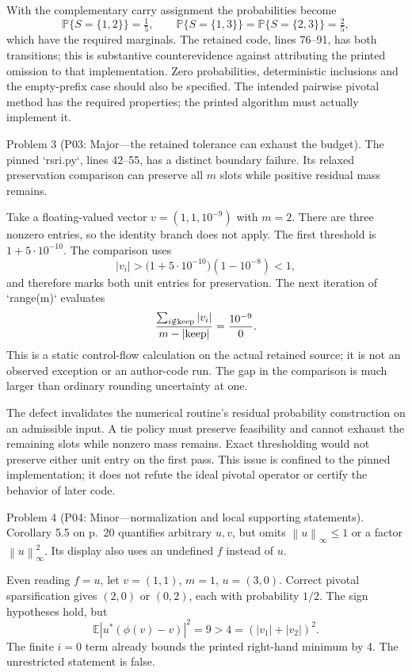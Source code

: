 \documentclass[10pt]{article}
\begin{document}
With the complementary carry assignment the probabilities become \[\mathbb P\{S=\{1,2\}\}=\tfrac15,\qquad
 \mathbb P\{S=\{1,3\}\}
 =\mathbb P\{S=\{2,3\}\}=\tfrac25,\] which have the required marginals. The retained code, lines 76–91, has both transitions; this is substantive counterevidence against attributing the printed omission to that implementation. Zero probabilities, deterministic inclusions and the empty-prefix case should also be specified. The intended pairwise pivotal method has the required properties; the printed algorithm must actually implement it.\par
Problem 3 (P03: Major—the retained tolerance can exhaust the budget).  The pinned `rsri.py`, lines 42–55, has a distinct boundary failure. Its relaxed preservation comparison can preserve all \(m\) slots while positive residual mass remains.\par
Take a floating-valued vector \(v=(1,1,10^{-9})\) with \(m=2\). There are three nonzero entries, so the identity branch does not apply. The first threshold is \(1+5\cdot10^{-10}\). The comparison uses \[|v_i|>\bigl(1+5\cdot10^{-10}\bigr)(1-10^{-8})<1,\] and therefore marks both unit entries for preservation. The next iteration of `range(m)` evaluates \[\frac{\sum_{i\notin{\rm keep}}|v_i|}
      {m-|{\rm keep}|}
 =\frac{10^{-9}}0.\] This is a static control-flow calculation on the actual retained source; it is not an observed exception or an author-code run. The gap in the comparison is much larger than ordinary rounding uncertainty at one.\par
The defect invalidates the numerical routine’s residual probability construction on an admissible input. A tie policy must preserve feasibility and cannot exhaust the remaining slots while nonzero mass remains. Exact thresholding would not preserve either unit entry on the first pass. This issue is confined to the pinned implementation; it does not refute the ideal pivotal operator or certify the behavior of later code.\par
Problem 4 (P04: Minor—normalization and local supporting statements).  Corollary 5.5 on p. 20 quantifies arbitrary \(u,v\), but omits \(\left\lVert u\right\rVert_\infty\le1\) or a factor \(\left\lVert u\right\rVert_\infty^2\). Its display also uses an undefined \(f\) instead of \(u\).\par
Even reading \(f=u\), let \(v=(1,1)\), \(m=1\), \(u=(3,0)\). Correct pivotal sparsification gives \((2,0)\) or \((0,2)\), each with probability \(1/2\). The sign hypotheses hold, but \[\mathbb E|u^*(\phi(v)-v)|^2=9>4=(|v_1|+|v_2|)^2.\] The finite \(i=0\) term already bounds the printed right-hand minimum by 4. The unrestricted statement is false.\par
\end{document}
